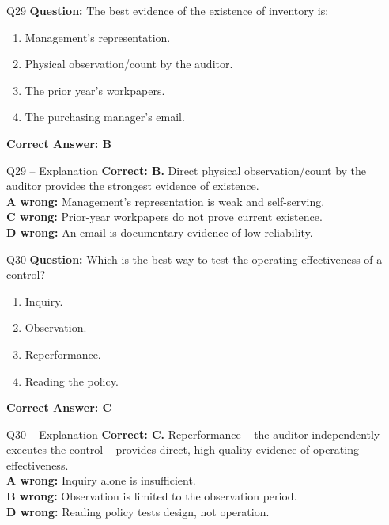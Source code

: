 \documentclass[aspectratio=169,10pt]{beamer}
\begin{document}
	\begin{frame}[t]{Q29}
		\small
		\textbf{Question:} The best evidence of the existence of inventory is:
		\begin{enumerate}[label=\Alph*.,itemsep=1pt,topsep=2pt]
			\item Management's representation.
			\item Physical observation/count by the auditor.
			\item The prior year's workpapers.
			\item The purchasing manager's email.
		\end{enumerate}
		\vspace{4pt}
		\textbf{Correct Answer: B}
	\end{frame}
	
	\begin{frame}[t]{Q29 -- Explanation}
		\small
		\textbf{Correct: B.} Direct physical observation/count by the auditor provides the strongest evidence of existence. \\[4pt]
		\textbf{A wrong:} Management's representation is weak and self-serving. \\[2pt]
		\textbf{C wrong:} Prior-year workpapers do not prove current existence. \\[2pt]
		\textbf{D wrong:} An email is documentary evidence of low reliability.
	\end{frame}
	
	\begin{frame}[t]{Q30}
		\small
		\textbf{Question:} Which is the best way to test the operating effectiveness of a control?
		\begin{enumerate}[label=\Alph*.,itemsep=1pt,topsep=2pt]
			\item Inquiry.
			\item Observation.
			\item Reperformance.
			\item Reading the policy.
		\end{enumerate}
		\vspace{4pt}
		\textbf{Correct Answer: C}
	\end{frame}
	
	\begin{frame}[t]{Q30 -- Explanation}
		\small
		\textbf{Correct: C.} Reperformance -- the auditor independently executes the control -- provides direct, high-quality evidence of operating effectiveness. \\[4pt]
		\textbf{A wrong:} Inquiry alone is insufficient. \\[2pt]
		\textbf{B wrong:} Observation is limited to the observation period. \\[2pt]
		\textbf{D wrong:} Reading policy tests design, not operation.
	\end{frame}
	
\end{document}
